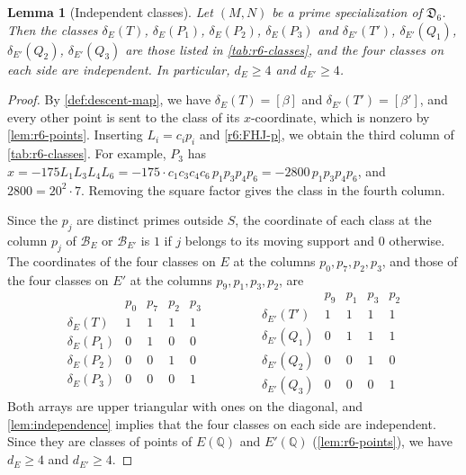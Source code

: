 \documentclass[12pt,oneside,openany]{book}
\theoremstyle{definition}
\theoremstyle{plain}
\numberwithin{equation}{chapter}
\theoremstyle{plain}
\newtheorem{lemma}[lemma]{Lemma}
\theoremstyle{definition}
\theoremstyle{remark}
\newcommand{\Q}{\mathbb Q}
\newcommand{\sq}[1]{[#1]}
\newcommand{\datum}{\mathfrak D}
\newcommand{\cB}{\mathcal B}
\begin{document}
\begin{lemma}[Independent classes]\label{lem:r6-classes}
Let $(M,N)$ be a prime specialization of $\datum_6$. Then the classes $\delta_E(T)$, $\delta_E(P_1)$, $\delta_E(P_2)$, $\delta_E(P_3)$ and $\delta_{E'}(T')$, $\delta_{E'}(Q_1)$, $\delta_{E'}(Q_2)$, $\delta_{E'}(Q_3)$ are those listed in \cref{tab:r6-classes}, and the four classes on each side are independent. In particular, $d_E\ge4$ and $d_{E'}\ge4$.
\end{lemma}

\begin{proof}
By \cref{def:descent-map}, we have $\delta_E(T)=\sq\beta$ and $\delta_{E'}(T')=\sq{\beta'}$, and every other point is sent to the class of its $x$-coordinate, which is nonzero by \cref{lem:r6-points}. Inserting $L_i=c_ip_i$ and \eqref{r6:FHJ-p}, we obtain the third column of \cref{tab:r6-classes}. For example, $P_3$ has $x=-175L_1L_3L_4L_6=-175\cdot c_1c_3c_4c_6\,p_1p_3p_4p_6=-2800\,p_1p_3p_4p_6$, and $2800=20^2\cdot7$. Removing the square factor gives the class in the fourth column.

Since the $p_j$ are distinct primes outside $S$, the coordinate of each class at the column $p_j$ of $\cB_E$ or $\cB_{E'}$ is $1$ if $j$ belongs to its moving support and $0$ otherwise. The coordinates of the four classes on $E$ at the columns $p_0,p_7,p_2,p_3$, and those of the four classes on $E'$ at the columns $p_9,p_1,p_3,p_2$, are
\[
\begin{array}{c|cccc}
 & p_0 & p_7 & p_2 & p_3\\
\hline
\delta_E(T) & 1 & 1 & 1 & 1\\
\delta_E(P_1) & 0 & 1 & 0 & 0\\
\delta_E(P_2) & 0 & 0 & 1 & 0\\
\delta_E(P_3) & 0 & 0 & 0 & 1
\end{array}
\qquad\qquad
\begin{array}{c|cccc}
 & p_9 & p_1 & p_3 & p_2\\
\hline
\delta_{E'}(T') & 1 & 1 & 1 & 1\\
\delta_{E'}(Q_1) & 0 & 1 & 1 & 1\\
\delta_{E'}(Q_2) & 0 & 0 & 1 & 0\\
\delta_{E'}(Q_3) & 0 & 0 & 0 & 1
\end{array}
\]
Both arrays are upper triangular with ones on the diagonal, and \cref{lem:independence} implies that the four classes on each side are independent. Since they are classes of points of $E(\Q)$ and $E'(\Q)$ (\cref{lem:r6-points}), we have $d_E\ge4$ and $d_{E'}\ge4$.
\end{proof}
\end{document}

